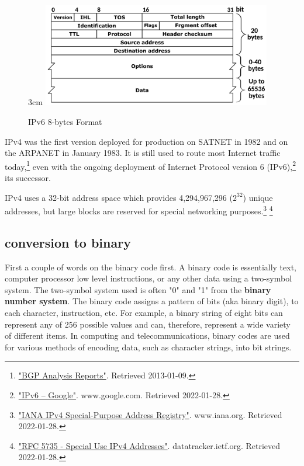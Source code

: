 \documentclass[a4paper,12pt]{book}
\begin{document}
\begin{figure}{3cm}
\centering
\includegraphics[width=10cm]{./IPv4_Packet-en.svg.PNG}
\caption{IPv6 8-bytes Format }\label{wrap-fig:9}
\end{figure}

IPv4 was the first version deployed for production on SATNET in 1982 and on the ARPANET in January 1983. It is still used to route most Internet traffic today,\footnote{\label{note2}\href{http://bgp.potaroo.net/index-bgp.html}{"BGP Analysis Reports"}. Retrieved 2013-01-09.} even with the ongoing deployment of Internet Protocol version 6 (IPv6),\footnote{\label{note3}\href{https://www.google.com/intl/en/ipv6/statistics.html}{"IPv6 – Google"}. www.google.com. Retrieved 2022-01-28.} its successor.

IPv4 uses a 32-bit address space which provides 4,294,967,296 ($2^{32}$) unique addresses, but large blocks are reserved for special networking purposes.\footnote{\label{note4}\href{https://www.iana.org/assignments/iana-ipv4-special-registry/iana-ipv4-special-registry.xhtml}{"IANA IPv4 Special-Purpose Address Registry"}. www.iana.org. Retrieved 2022-01-28.} \footnote{\label{note5}\href{https://datatracker.ietf.org/doc/html/rfc5735}{"RFC 5735 - Special Use IPv4 Addresses"}. datatracker.ietf.org. Retrieved 2022-01-28.}




\subsection{conversion to binary}

First a couple of words on the binary code first. A binary code is essentially text, computer processor low level instructions, or any other data using a two-symbol system. The two-symbol system used is often "0" and "1" from the \textbf{binary number system}. The binary code assigns a pattern of bits (aka binary digit), to each character, instruction, etc. For example, a binary string of eight bits can represent any of 256 possible values and can, therefore, represent a wide variety of different items.
In computing and telecommunications, binary codes are used for various methods of encoding data, such as character strings, into bit strings. 
\end{document}
